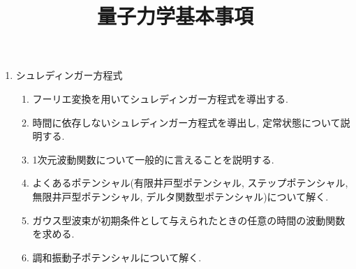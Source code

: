 \documentclass[11pt,a4paper]{jarticle}
\title{量子力学基本事項}
\author{}
\date{}
\begin{document}
\maketitle
\begin{enumerate}
    \item シュレディンガー方程式
    \begin{enumerate}
        \item フーリエ変換を用いてシュレディンガー方程式を導出する.
        \item 時間に依存しないシュレディンガー方程式を導出し, 定常状態について説明する.
        \item 1次元波動関数について一般的に言えることを説明する.
        \item よくあるポテンシャル(有限井戸型ポテンシャル, ステップポテンシャル, 無限井戸型ポテンシャル, デルタ関数型ポテンシャル)について解く.
        \item ガウス型波束が初期条件として与えられたときの任意の時間の波動関数を求める.
        \item 調和振動子ポテンシャルについて解く.
    \end{enumerate}
\end{enumerate}
\end{document}
